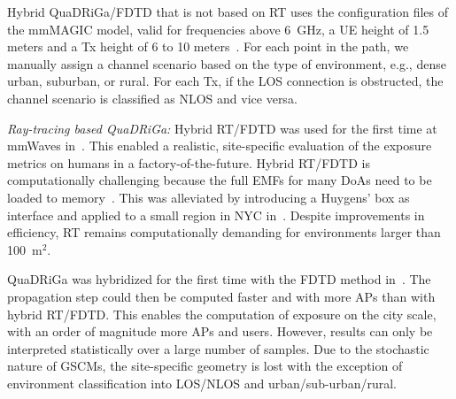 \documentclass{IEEEtran}
\begin{document}
Hybrid \gls{QuaDRiGa}/\gls{FDTD} that is not based on \gls{RT} uses the configuration files of the mmMAGIC model, valid for frequencies above 6~GHz, a \gls{UE} height of 1.5 meters and a Tx height of 6 to 10 meters~\cite{mmMAGIC}. For each point in the path, we manually assign a channel scenario based on the type of environment, e.g., dense urban, suburban, or rural. For each Tx, if the \gls{LOS} connection is obstructed, the channel scenario is classified as \gls{NLOS} and vice versa.

\textit{Ray-tracing based QuaDRiGa:} Hybrid \gls{RT}/\gls{FDTD} was used for the first time at mmWaves in~\cite{RT/FDTD1}. This enabled a realistic, site-specific evaluation of the exposure metrics on humans in a factory-of-the-future. Hybrid \gls{RT}/\gls{FDTD} is computationally challenging because the full \glspl{EMF} for many \glspl{DoA} need to be loaded to memory~\cite{RT/FDTD2}. This was alleviated by introducing a Huygens' box as interface and applied to a small region in \gls{NYC} in~\cite{hotspots_eucap}. Despite improvements in efficiency, \gls{RT} remains computationally demanding for environments larger than 100~m$^2$.

\gls{QuaDRiGa} was hybridized for the first time with the \gls{FDTD} method in~\cite{QD/FDTD}. The propagation step could then be computed faster and with more \glspl{AP} than with hybrid \gls{RT}/\gls{FDTD}. This enables the computation of exposure on the city scale, with an order of magnitude more APs and users. However, results can only be interpreted statistically over a large number of samples. Due to the stochastic nature of \glspl{GSCM}, the site-specific geometry is lost with the exception of environment classification into \gls{LOS}/\gls{NLOS} and urban/sub-urban/rural.
\end{document}
